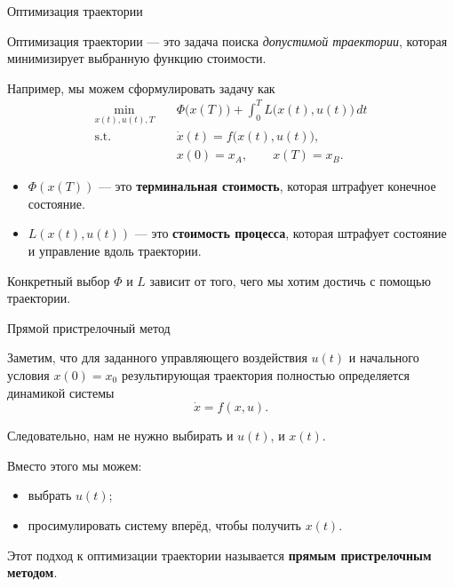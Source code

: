 \documentclass{beamer}
\begin{document}
	\begin{frame}{Оптимизация траектории}
		\begin{flushleft}
			Оптимизация траектории — это задача поиска
			\emph{допустимой траектории}, которая минимизирует выбранную
			функцию стоимости.
			
			\vspace{0.5em}
			
			Например, мы можем сформулировать задачу как
			\[
			\begin{aligned}
				\min_{x(t),u(t),T}\quad
				&
				\Phi\bigl(x(T)\bigr)
				+
				\int_0^T L\bigl(x(t),u(t)\bigr)\,dt
				\\
				\text{s.t.}\quad
				&
				\dot{x}(t)=f\bigl(x(t),u(t)\bigr),
				\\
				&
				x(0)=x_A,
				\qquad
				x(T)=x_B.
			\end{aligned}
			\]
			
			\begin{itemize}
				\item $\Phi(x(T))$ — это \textbf{терминальная стоимость}, которая
				штрафует конечное состояние.
				
				\item $L(x(t),u(t))$ — это \textbf{стоимость процесса}, которая
				штрафует состояние и управление вдоль траектории.
			\end{itemize}
			
			Конкретный выбор $\Phi$ и $L$ зависит от того, чего
			мы хотим достичь с помощью траектории.
		\end{flushleft}
	\end{frame}
	
	\begin{frame}{Прямой пристрелочный метод}
		\begin{flushleft}
			Заметим, что для заданного управляющего воздействия $u(t)$ и
			начального условия $x(0)=x_0$ результирующая траектория полностью определяется
			динамикой системы
			\[
			\dot{x}=f(x,u).
			\]
			
			\vspace{0.5em}
			
			Следовательно, нам не нужно выбирать и $u(t)$, и $x(t)$.
			
			Вместо этого мы можем:
			\begin{itemize}
				\item выбрать $u(t)$;
				\item просимулировать систему вперёд, чтобы получить $x(t)$.
			\end{itemize}
			
			\vspace{0.5em}
			
			Этот подход к оптимизации траектории называется
			\textbf{прямым пристрелочным методом}.
		\end{flushleft}
	\end{frame}
	
\end{document}
